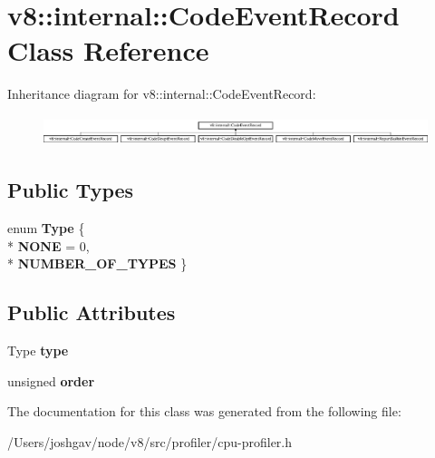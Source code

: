 \hypertarget{classv8_1_1internal_1_1_code_event_record}{}\section{v8\+:\+:internal\+:\+:Code\+Event\+Record Class Reference}
\label{classv8_1_1internal_1_1_code_event_record}
Inheritance diagram for v8\+:\+:internal\+:\+:Code\+Event\+Record\+:\begin{figure}[H]
\begin{center}
\leavevmode
\includegraphics[height=0.885375cm]{classv8_1_1internal_1_1_code_event_record}
\end{center}
\end{figure}
\subsection*{Public Types}
\begin{DoxyCompactItemize}
\item 
enum {\bfseries Type} \{ \\*
{\bfseries N\+O\+NE} = 0, 
\\*
{\bfseries N\+U\+M\+B\+E\+R\+\_\+\+O\+F\+\_\+\+T\+Y\+P\+ES}
 \}\hypertarget{classv8_1_1internal_1_1_code_event_record_ad95141a659db53d824d82e91f357d7bc}{}\label{classv8_1_1internal_1_1_code_event_record_ad95141a659db53d824d82e91f357d7bc}

\end{DoxyCompactItemize}
\subsection*{Public Attributes}
\begin{DoxyCompactItemize}
\item 
Type {\bfseries type}\hypertarget{classv8_1_1internal_1_1_code_event_record_a2ef08c576ec1178cdf525e1823b24762}{}\label{classv8_1_1internal_1_1_code_event_record_a2ef08c576ec1178cdf525e1823b24762}

\item 
unsigned {\bfseries order}\hypertarget{classv8_1_1internal_1_1_code_event_record_aeee2145d3bfcdb0120d2a915839548a0}{}\label{classv8_1_1internal_1_1_code_event_record_aeee2145d3bfcdb0120d2a915839548a0}

\end{DoxyCompactItemize}


The documentation for this class was generated from the following file\+:\begin{DoxyCompactItemize}
\item 
/\+Users/joshgav/node/v8/src/profiler/cpu-\/profiler.\+h\end{DoxyCompactItemize}
